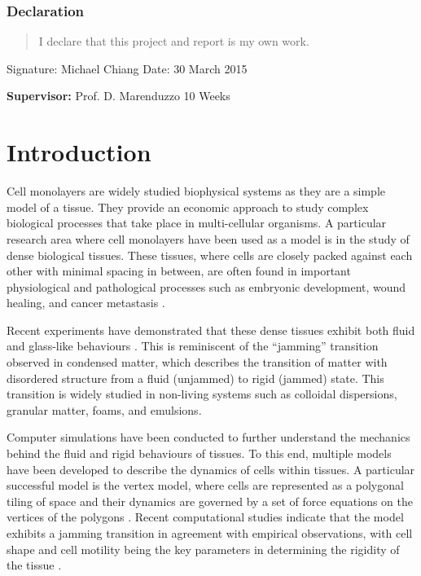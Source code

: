 \documentclass[a4paper,12pt]{article}
\begin{document}
\vspace*{0.5cm}

\subsubsection*{Declaration}

\begin{quotation}
        I declare that this project and report is my own work.
\end{quotation}

\vspace*{0.5cm}
Signature: Michael Chiang \hspace*{6.5cm}Date: 30 March 2015

\vfill
{\bf Supervisor:} Prof. D. Marenduzzo                 %
\hfill
10 Weeks                                         %
\newpage
%
\pagestyle{plain}                               %
\setcounter{page}{1}                            %
\tableofcontents                                %

\break
\section{Introduction}
Cell monolayers are widely studied biophysical systems as they are a simple model of a tissue. They provide an economic approach to study complex biological processes that take place in multi-cellular organisms. A particular research area where cell monolayers have been used as a model is in the study of dense biological tissues. These tissues, where cells are closely packed against each other with minimal spacing in between, are often found in important physiological and pathological processes such as embryonic development, wound healing, and cancer metastasis \cite{friedl2009}.  

Recent experiments have demonstrated that these dense tissues exhibit both fluid and glass-like behaviours \cite{angelini2010, schoetz2013}. This is reminiscent of the ``jamming'' transition observed in condensed matter, which describes the transition of matter with disordered structure from a fluid (unjammed) to rigid (jammed) state. This transition is widely studied in non-living systems such as colloidal dispersions, granular matter, foams, and emulsions. 

Computer simulations have been conducted to further understand the mechanics behind the fluid and rigid behaviours of tissues. To this end, multiple models have been developed to describe the dynamics of cells within tissues. A particular successful model is the vertex model, where cells are represented as a polygonal tiling of space and their dynamics are governed by a set of force equations on the vertices of the polygons \cite{nagai2001}. Recent computational studies indicate that the model exhibits a jamming transition in agreement with empirical observations, with cell shape and cell motility being the key parameters in determining the rigidity of the tissue \cite{bi2015density, bi2015motility}.
\end{document}
